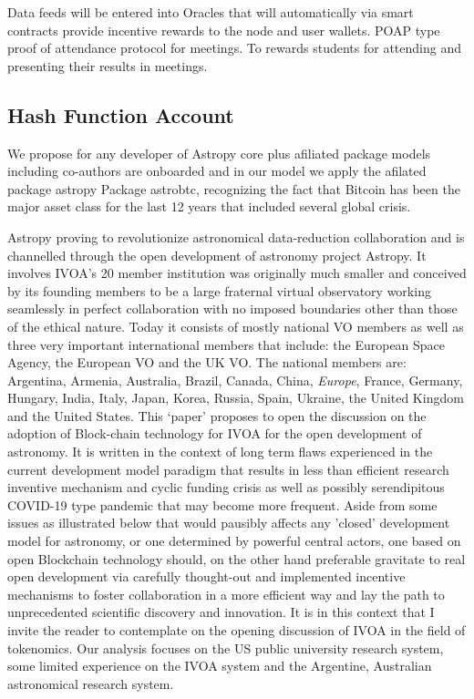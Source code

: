 \documentclass[final,5p,times,twocolumn,authoryear]{elsarticle}
\begin{document}
Data feeds will be entered into Oracles that will automatically via smart contracts provide incentive rewards to the node and user wallets.
%
POAP type proof of attendance protocol for meetings. To rewards students for attending and presenting their results in meetings.
%
\subsection{Hash Function Account}
We propose for any developer of Astropy core plus afiliated package models including co-authors are onboarded and in our model we apply the afilated package astropy Package astrobtc, recognizing the fact that Bitcoin has been the major asset class for the last 12 years that included several global crisis. 
%

Astropy proving to revolutionize astronomical data-reduction collaboration and is channelled through the open development of astronomy project Astropy. It involves IVOA's 20 member institution was originally much smaller and conceived by its founding members to be a large fraternal virtual observatory working seamlessly in perfect collaboration with no imposed boundaries other than those of the ethical nature. Today it consists of mostly national VO members as well as three very important international members that include: the European Space Agency, the European VO and the UK VO. The national members are: Argentina, Armenia, Australia, Brazil, Canada, China, \textit{Europe}, France, Germany, Hungary, India, Italy, Japan, Korea, Russia, Spain, Ukraine, the United Kingdom and the United States. This `paper' proposes to open the discussion on the adoption of Block-chain technology for IVOA for the open development of astronomy. It is written in the context of long term flaws experienced in the current development model paradigm that results in less than efficient research inventive mechanism and cyclic funding crisis as well as possibly serendipitous COVID-19 type pandemic that may become more frequent.
%
Aside from some issues as illustrated below that would pausibly affects any 'closed' development model for astronomy, or one determined by powerful central actors, one based on open Blockchain technology should, on the other hand preferable gravitate to real open development via carefully thought-out and implemented incentive mechanisms to foster collaboration in a more efficient way and lay the path to unprecedented scientific discovery and innovation. It is in this context that I invite the reader to contemplate on the opening discussion of IVOA in the field of tokenomics. 
%
Our analysis focuses on the US public university research system, some limited experience on the IVOA system and the Argentine, Australian astronomical research system. 
   
\end{document}
